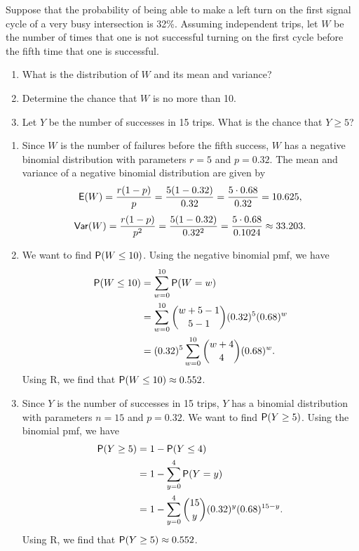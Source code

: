 \documentclass[12pt]{article}
\newcommand{\Prob}{{\sf P}}
\newcommand{\E}{{\sf E}}
\newcommand{\Var}{{\sf Var}}
\newenvironment{problem}[2][Problem]{\begin{trivlist}
\item[\hskip \labelsep {\bfseries #1}\hskip \labelsep {\bfseries #2.}]}
{\end{trivlist}}
\begin{document}
\begin{problem}{4}
  Suppose that the probability of being able to make a left turn 
  on the first signal cycle of a very busy intersection is 32\%. 
  Assuming independent trips, let $W$ be the number of times
  that one is not successful turning on the first cycle before 
  the fifth time that one is successful.
  \begin{enumerate}
    \item What is the distribution of $W$ and its mean and variance?
    \item Determine the chance that $W$ is no more than 10.
    \item Let $Y$ be the number of successes in 15 trips. 
    What is the chance that $Y \geq 5$?
  \end{enumerate}
  \begin{enumerate}
    \item Since $W$ is the number of failures before the fifth success,
    $W$ has a negative binomial distribution with parameters $r = 5$ and $p = 0.32$.
    The mean and variance of a negative binomial distribution are given by
    \[
      \E(W) = \frac{r(1-p)}{p} = \frac{5(1-0.32)}{0.32} 
      = \frac{5 \cdot 0.68}{0.32} = 10.625,
    \]
    \[
      \Var(W) = \frac{r(1-p)}{p^2} = \frac{5(1-0.32)}{0.32^2} 
      = \frac{5 \cdot 0.68}{0.1024} \approx 33.203.
    \]
    \item We want to find $\Prob(W \leq 10)$. Using the negative binomial pmf, 
    we have
    \[
      \begin{aligned}
        \Prob(W \leq 10) &= \sum_{w=0}^{10} \Prob(W = w) \\
        &= \sum_{w=0}^{10} \binom{w+5-1}{5-1} (0.32)^5 (0.68)^w \\
        &= (0.32)^5 \sum_{w=0}^{10} \binom{w+4}{4} (0.68)^w.
      \end{aligned}
    \]
    Using R, we find that $\Prob(W \leq 10) \approx 0.552$.

    \item Since $Y$ is the number of successes in 15 trips,
    $Y$ has a binomial distribution with parameters $n = 15$ and $p = 0.32$.
    We want to find $\Prob(Y \geq 5)$. Using the binomial pmf, we have
    \[
      \begin{aligned}
        \Prob(Y \geq 5) &= 1 - \Prob(Y \leq 4) \\
        &= 1 - \sum_{y=0}^{4} \Prob(Y = y) \\
        &= 1 - \sum_{y=0}^{4} \binom{15}{y} (0.32)^y (0.68)^{15-y}.
      \end{aligned}
    \]
    Using R, we find that $\Prob(Y \geq 5) \approx 0.552$.
  \end{enumerate}
\end{problem}
\end{document}
